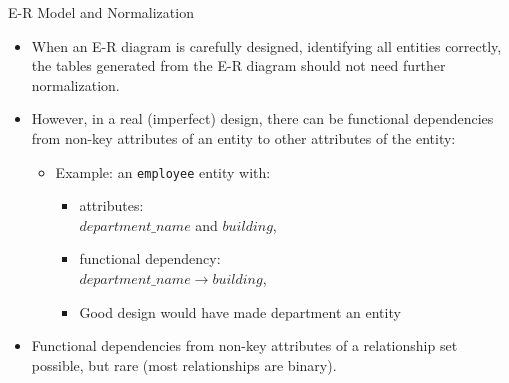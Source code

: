 \documentclass{beamer}
\begin{document}
\begin{frame}{E-R Model and Normalization}
    \begin{itemize}
        \item When an E-R diagram is carefully designed, identifying all entities correctly, the tables generated from the E-R diagram should not need further normalization.
        \item However, in a real (imperfect) design, there can be functional dependencies from non-key attributes of an entity to other attributes of the entity:
            \begin{itemize}
                \item Example: an \texttt{employee} entity with:
                    \begin{itemize}
                        \item attributes: \\
                            \quad $department\_name$ and $building$,
                        \item functional dependency: \\
                            \quad $department\_name \rightarrow building$,
                        \item Good design would have made department an entity
                    \end{itemize}

            \end{itemize}
        \item Functional dependencies from non-key attributes of a relationship set possible, but rare (most relationships are binary).
    \end{itemize}
\end{frame}
\end{document}
